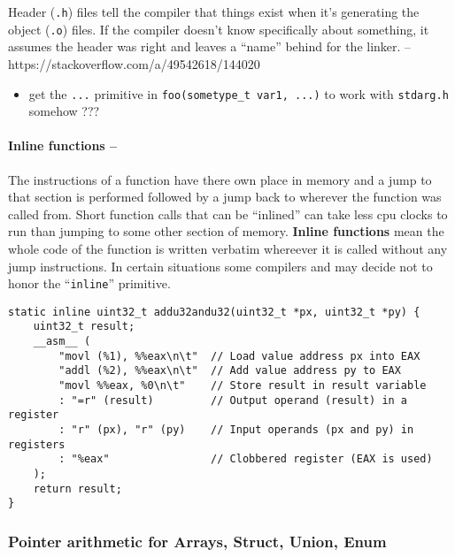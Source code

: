Header (\texttt{.h}) files tell the compiler that things exist when it's
generating the object (\texttt{.o}) files. If the compiler doesn't know
specifically about something, it assumes the header was right and leaves
a ``name'' behind for the linker. --
https://stackoverflow.com/a/49542618/144020

\begin{itemize}
\tightlist
\item
  get the \texttt{...} primitive in
  \texttt{foo(sometype\_t\ var1,\ ...)} to work with \texttt{stdarg.h}
  somehow ???
\end{itemize}

\hypertarget{inline-functions}{%
\paragraph{Inline functions --}\label{inline-functions}}

The instructions of a function have there own place in memory and a jump
to that section is performed followed by a jump back to wherever the
function was called from. Short function calls that can be ``inlined''
can take less cpu clocks to run than jumping to some other section of
memory. \textbf{Inline functions} mean the whole code of the function is
written verbatim whereever it is called without any jump instructions.
In certain situations some compilers and may decide not to honor the
``\texttt{inline}'' primitive.

\begin{verbatim}
static inline uint32_t addu32andu32(uint32_t *px, uint32_t *py) {
    uint32_t result;
    __asm__ (
        "movl (%1), %%eax\n\t"  // Load value address px into EAX
        "addl (%2), %%eax\n\t"  // Add value address py to EAX
        "movl %%eax, %0\n\t"    // Store result in result variable
        : "=r" (result)         // Output operand (result) in a register
        : "r" (px), "r" (py)    // Input operands (px and py) in registers
        : "%eax"                // Clobbered register (EAX is used)
    );
    return result;
}
\end{verbatim}

\hypertarget{pointer-arithmetic-for-arrays-struct-union-enum}{%
\subsubsection{Pointer arithmetic for Arrays, Struct, Union,
Enum}\label{pointer-arithmetic-for-arrays-struct-union-enum}}

